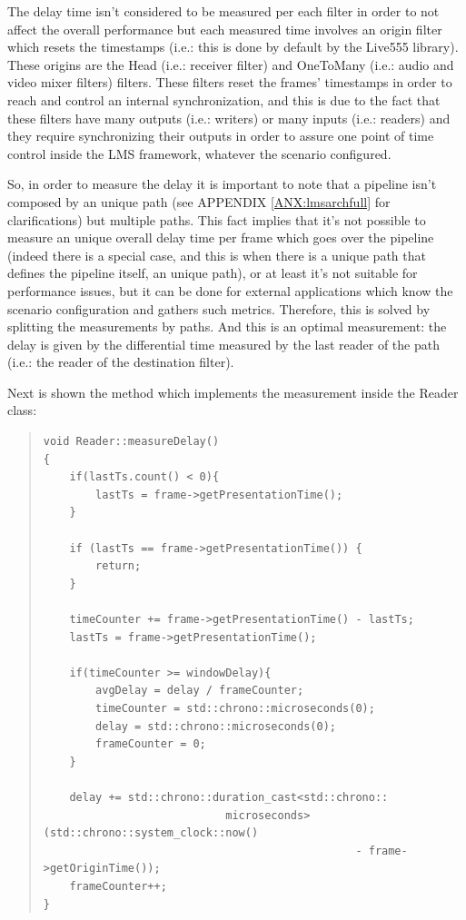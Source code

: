 The delay time isn't considered to be measured per each filter in order to not affect the overall performance but each measured time involves an origin filter which resets the timestamps (i.e.: this is done by default by the Live555 library). These origins are the Head (i.e.: receiver filter) and OneToMany (i.e.: audio and video mixer filters) filters. These filters reset the frames' timestamps in order to reach and control an internal synchronization, and this is due to the fact that these filters have many outputs (i.e.: writers) or many inputs (i.e.: readers) and they require synchronizing their outputs in order to assure one point of time control inside the LMS framework, whatever the scenario configured.

So, in order to measure the delay it is important to note that a pipeline isn't composed by an unique path (see APPENDIX \ref{ANX:lmsarchfull} for clarifications) but multiple paths. This fact implies that it's not possible to measure an unique overall delay time per frame which goes over the pipeline (indeed there is a special case, and this is when there is a unique path that defines the pipeline itself, an unique path), or at least it's not suitable for performance issues, but it can be done for external applications which know the scenario configuration and gathers such metrics. Therefore, this is solved by splitting the measurements by paths. And this is an optimal measurement: the delay is given by the differential time measured by the last reader of the path (i.e.: the reader of the destination filter).

Next is shown the method which implements the measurement inside the Reader class:

\begin{quote}
\begin{verbatim}
void Reader::measureDelay()
{
    if(lastTs.count() < 0){
        lastTs = frame->getPresentationTime();
    }

    if (lastTs == frame->getPresentationTime()) {
        return;
    }

    timeCounter += frame->getPresentationTime() - lastTs;
    lastTs = frame->getPresentationTime();

    if(timeCounter >= windowDelay){
        avgDelay = delay / frameCounter;
        timeCounter = std::chrono::microseconds(0);
        delay = std::chrono::microseconds(0);
        frameCounter = 0;
    }
    
    delay += std::chrono::duration_cast<std::chrono::
    						microseconds>(std::chrono::system_clock::now() 
    											- frame->getOriginTime());
    frameCounter++;
}
\end{verbatim}
\end{quote} 


